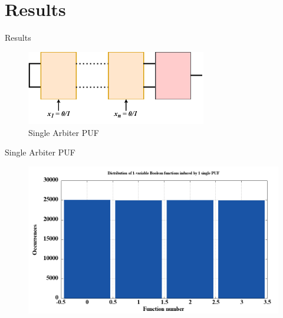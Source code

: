 \documentclass[10pt, compress]{beamer}
\begin{document}
\section{Results}


\begin{frame}{Results}
    \begin{figure}
        \centering
        \includegraphics[width=0.7\textwidth]{figures/puf_1.pdf}
        \caption{Single Arbiter PUF}
    \end{figure}
\end{frame}

\begin{frame}{Single Arbiter PUF}
    \begin{figure}
        \centering
        \includegraphics[width=\textwidth]{figures/dist/distribution_of_1-variable_boolean_functions_induced_by_1_single_puf.png}
    \end{figure}
\end{frame}
\end{document}
